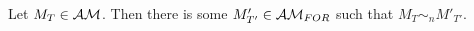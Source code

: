 %

\begin{thm} \label{approximatingEventModel}
Let $M_T \in \mathcal{AM}$.
Then there is some $M'_{T'} \in \mathcal{AM}_{FOR}$ such that $M_T \sim_n M'_{T'}$.
\end{thm}


